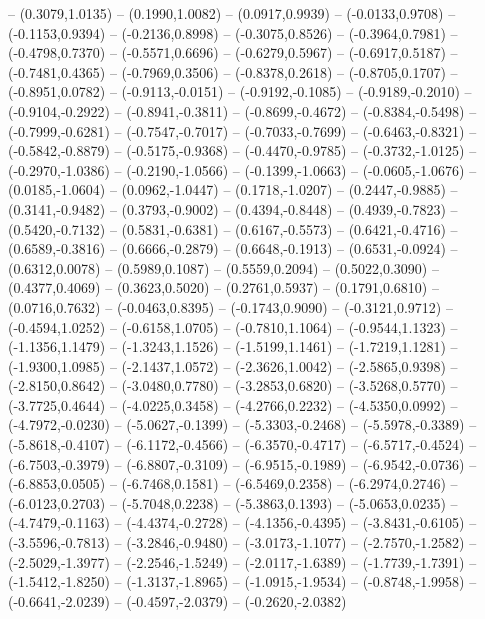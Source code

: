 {	-- (0.3079,1.0135)
	-- (0.1990,1.0082)
	-- (0.0917,0.9939)
	-- (-0.0133,0.9708)
	-- (-0.1153,0.9394)
	-- (-0.2136,0.8998)
	-- (-0.3075,0.8526)
	-- (-0.3964,0.7981)
	-- (-0.4798,0.7370)
	-- (-0.5571,0.6696)
	-- (-0.6279,0.5967)
	-- (-0.6917,0.5187)
	-- (-0.7481,0.4365)
	-- (-0.7969,0.3506)
	-- (-0.8378,0.2618)
	-- (-0.8705,0.1707)
	-- (-0.8951,0.0782)
	-- (-0.9113,-0.0151)
	-- (-0.9192,-0.1085)
	-- (-0.9189,-0.2010)
	-- (-0.9104,-0.2922)
	-- (-0.8941,-0.3811)
	-- (-0.8699,-0.4672)
	-- (-0.8384,-0.5498)
	-- (-0.7999,-0.6281)
	-- (-0.7547,-0.7017)
	-- (-0.7033,-0.7699)
	-- (-0.6463,-0.8321)
	-- (-0.5842,-0.8879)
	-- (-0.5175,-0.9368)
	-- (-0.4470,-0.9785)
	-- (-0.3732,-1.0125)
	-- (-0.2970,-1.0386)
	-- (-0.2190,-1.0566)
	-- (-0.1399,-1.0663)
	-- (-0.0605,-1.0676)
	-- (0.0185,-1.0604)
	-- (0.0962,-1.0447)
	-- (0.1718,-1.0207)
	-- (0.2447,-0.9885)
	-- (0.3141,-0.9482)
	-- (0.3793,-0.9002)
	-- (0.4394,-0.8448)
	-- (0.4939,-0.7823)
	-- (0.5420,-0.7132)
	-- (0.5831,-0.6381)
	-- (0.6167,-0.5573)
	-- (0.6421,-0.4716)
	-- (0.6589,-0.3816)
	-- (0.6666,-0.2879)
	-- (0.6648,-0.1913)
	-- (0.6531,-0.0924)
	-- (0.6312,0.0078)
	-- (0.5989,0.1087)
	-- (0.5559,0.2094)
	-- (0.5022,0.3090)
	-- (0.4377,0.4069)
	-- (0.3623,0.5020)
	-- (0.2761,0.5937)
	-- (0.1791,0.6810)
	-- (0.0716,0.7632)
	-- (-0.0463,0.8395)
	-- (-0.1743,0.9090)
	-- (-0.3121,0.9712)
	-- (-0.4594,1.0252)
	-- (-0.6158,1.0705)
	-- (-0.7810,1.1064)
	-- (-0.9544,1.1323)
	-- (-1.1356,1.1479)
	-- (-1.3243,1.1526)
	-- (-1.5199,1.1461)
	-- (-1.7219,1.1281)
	-- (-1.9300,1.0985)
	-- (-2.1437,1.0572)
	-- (-2.3626,1.0042)
	-- (-2.5865,0.9398)
	-- (-2.8150,0.8642)
	-- (-3.0480,0.7780)
	-- (-3.2853,0.6820)
	-- (-3.5268,0.5770)
	-- (-3.7725,0.4644)
	-- (-4.0225,0.3458)
	-- (-4.2766,0.2232)
	-- (-4.5350,0.0992)
	-- (-4.7972,-0.0230)
	-- (-5.0627,-0.1399)
	-- (-5.3303,-0.2468)
	-- (-5.5978,-0.3389)
	-- (-5.8618,-0.4107)
	-- (-6.1172,-0.4566)
	-- (-6.3570,-0.4717)
	-- (-6.5717,-0.4524)
	-- (-6.7503,-0.3979)
	-- (-6.8807,-0.3109)
	-- (-6.9515,-0.1989)
	-- (-6.9542,-0.0736)
	-- (-6.8853,0.0505)
	-- (-6.7468,0.1581)
	-- (-6.5469,0.2358)
	-- (-6.2974,0.2746)
	-- (-6.0123,0.2703)
	-- (-5.7048,0.2238)
	-- (-5.3863,0.1393)
	-- (-5.0653,0.0235)
	-- (-4.7479,-0.1163)
	-- (-4.4374,-0.2728)
	-- (-4.1356,-0.4395)
	-- (-3.8431,-0.6105)
	-- (-3.5596,-0.7813)
	-- (-3.2846,-0.9480)
	-- (-3.0173,-1.1077)
	-- (-2.7570,-1.2582)
	-- (-2.5029,-1.3977)
	-- (-2.2546,-1.5249)
	-- (-2.0117,-1.6389)
	-- (-1.7739,-1.7391)
	-- (-1.5412,-1.8250)
	-- (-1.3137,-1.8965)
	-- (-1.0915,-1.9534)
	-- (-0.8748,-1.9958)
	-- (-0.6641,-2.0239)
	-- (-0.4597,-2.0379)
	-- (-0.2620,-2.0382)
}
